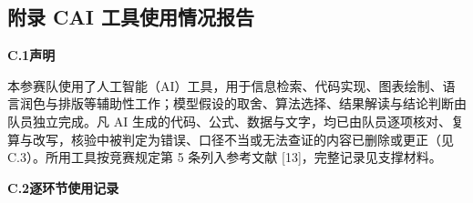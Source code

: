 \subsection*{附录 C\quad AI 工具使用情况报告}

{\footnotesize
\setlength{\tabcolsep}{2.5pt}
\renewcommand{\arraystretch}{1.06}
\noindent\textbf{C.1\quad 声明}

本参赛队使用了人工智能（AI）工具，用于信息检索、代码实现、图表绘制、语言润色与排版等辅助性工作；模型假设的取舍、算法选择、结果解读与结论判断由队员独立完成。凡 AI 生成的代码、公式、数据与文字，均已由队员逐项核对、复算与改写，核验中被判定为错误、口径不当或无法查证的内容已删除或更正（见 C.3）。所用工具按竞赛规定第 5 条列入参考文献 [13]，完整记录见支撑材料。

\vspace{4pt}
\noindent\textbf{C.2\quad 逐环节使用记录}

}
